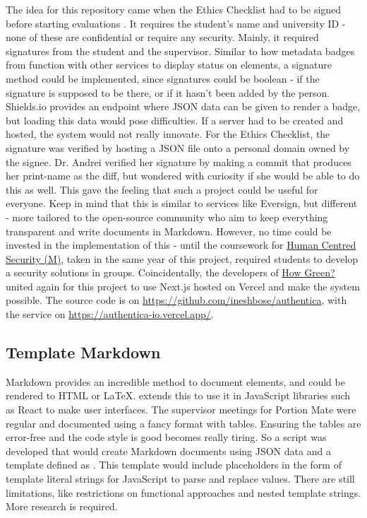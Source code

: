 \documentclass[../main.tex]{subfiles}
\begin{document}
The idea for this repository came when the Ethics Checklist had to be signed before starting evaluations \cite{Issue41}. It requires the student's name and university ID - none of these are confidential or require any security. Mainly, it required signatures from the student and the supervisor. Similar to how metadata badges from  function with other services to display status on elements, a signature method could be implemented, since signatures could be boolean -  if the signature is supposed to be there, or  if it hasn't been added by the person. Shields.io provides an endpoint where JSON data can be given to render a badge, but loading this data would pose difficulties. If a server had to be created and hosted, the system would not really innovate. For the Ethics Checklist, the signature was verified by hosting a JSON file onto a personal domain owned by the signee. Dr. Andrei verified her signature by making a commit that produces her print-name as the diff, but wondered with curiosity if she would be able to do this as well. This gave the feeling that such a project could be useful for everyone. Keep in mind that this is similar to services like Eversign, but different - more tailored to the open-source community who aim to keep everything transparent and write documents in Markdown. However, no time could be invested in the implementation of this - until the coursework for \href{https://www.gla.ac.uk/coursecatalogue/course/?code=COMPSCI5060}{Human Centred Security (M)}, taken in the same year of this project, required students to develop a security solutions in groups. Coincidentally, the developers of \href{https://github.com/ineshbose/how-green}{How Green?} united again for this project to use Next.js hosted on Vercel and make the system possible. The source code is on \href{https://github.com/ineshbose/authentica}{https://github.com/ineshbose/authentica}, with the service on \href{https://authentica-io.vercel.app/}{https://authentica-io.vercel.app/}.

\subsection{Template Markdown}

Markdown provides an incredible method to document elements, and could be rendered to HTML or \LaTeX.  extends this to use it in JavaScript libraries such as React to make user interfaces. The supervisor meetings for Portion Mate were regular and documented using a fancy format with tables. Ensuring the tables are error-free and the code style is good becomes really tiring. So a script was developed that would create Markdown documents using JSON data and a template defined as . This template would include placeholders in the form of template literal strings for JavaScript to parse and replace values. There are still limitations, like restrictions on functional approaches and nested template strings. More research is required.
\end{document}
